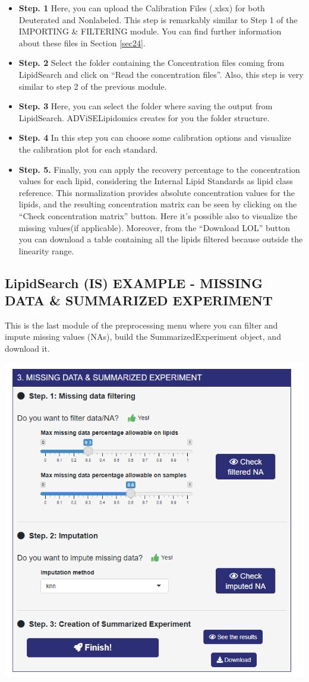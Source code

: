\documentclass[
]{book}
\providecommand{\tightlist}{%
  \setlength{\itemsep}{0pt}\setlength{\parskip}{0pt}}
\begin{document}
\begin{itemize}
\tightlist
\item
  \textbf{Step. 1} Here, you can upload the Calibration Files (.xlsx) for both Deuterated and Nonlabeled. This step is remarkably similar to Step 1 of the IMPORTING \& FILTERING module. You can find further information about these files in Section \ref{sec24}.
\item
  \textbf{Step. 2} Select the folder containing the Concentration files coming from LipidSearch and click on ``Read the concentration files''. Also, this step is very similar to step 2 of the previous module.
\item
  \textbf{Step. 3} Here, you can select the folder where saving the output from LipidSearch. ADViSELipidomics creates for you the folder structure.
\item
  \textbf{Step. 4} In this step you can choose some calibration options and visualize the calibration plot for each standard.
\item
  \textbf{Step. 5.} Finally, you can apply the recovery percentage to the concentration values for each lipid, considering the Internal Lipid Standards as lipid class reference. This normalization provides absolute concentration values for the lipids, and the resulting concentration matrix can be seen by clicking on the ``Check concentration matrix'' button. Here it's possible also to visualize the missing values(if applicable). Moreover, from the ``Download LOL'' button you can download a table containing all the lipids filtered because outside the linearity range.
\end{itemize}

\hypertarget{sec323}{%
\subsection{LipidSearch (IS) EXAMPLE - MISSING DATA \& SUMMARIZED EXPERIMENT}\label{sec323}}

This is the last module of the preprocessing menu where you can filter and impute missing values (NAs), build the SummarizedExperiment object, and download it.

\begin{center}\includegraphics[width=0.6\linewidth]{images/filtering_step} \end{center}
\end{document}
